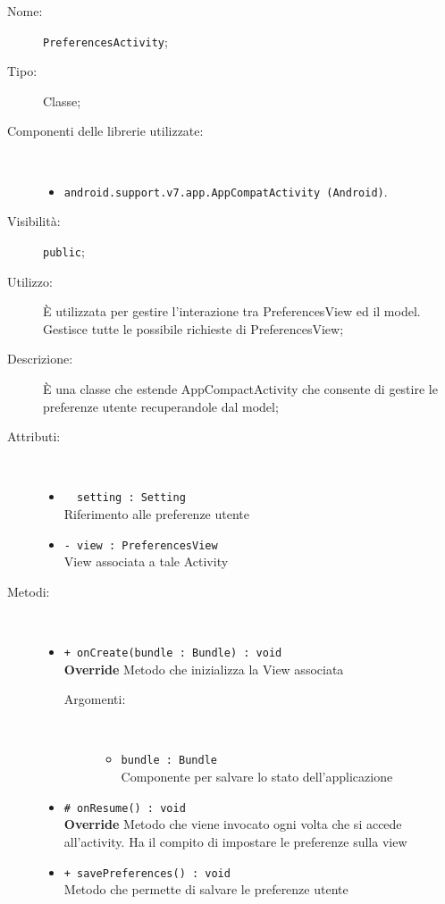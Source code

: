 \documentclass[../DefinizioneDiProdotto.tex]{subfiles}
\begin{document}
\begin{description}
	\item[Nome:] \texttt{PreferencesActivity};
	\item[Tipo:] Classe;
	\item[Componenti delle librerie utilizzate:] \
	\begin{itemize}
		\item \texttt{android.support.v7.app.AppCompatActivity (Android)}.
		
	\end{itemize}
	\item[Visibilità:] \texttt{public};
	\item[Utilizzo:] È utilizzata per gestire l'interazione tra PreferencesView ed il model. Gestisce tutte le possibile richieste di PreferencesView;
	\item[Descrizione:] È una classe che estende AppCompactActivity che consente di gestire le preferenze utente recuperandole dal model;
	\item[Attributi:] \
	\begin{itemize}
		\item \texttt{~ setting : Setting}\\
		Riferimento alle preferenze utente
		
		\item \texttt{- view : PreferencesView}\\
		View associata a tale Activity
		
	\end{itemize}
	\item[Metodi:] \
	\begin{itemize}
		\item \texttt{+ onCreate(bundle : Bundle) : void}\\
		\textbf{Override} Metodo che inizializza la View associata
		\begin{description}
			\item[Argomenti:] \
			\begin{itemize}
				\item \texttt{bundle : Bundle}\\
				Componente per salvare lo stato dell'applicazione\end{itemize}
		\end{description}
		\item \texttt{\# onResume() : void}\\
		\textbf{Override} Metodo che viene invocato ogni volta che si accede all'activity. Ha il compito di impostare le preferenze sulla view
		\item \texttt{+ savePreferences() : void}\\
		Metodo che permette di salvare le preferenze utente
	\end{itemize}
\end{description}
\end{document}
